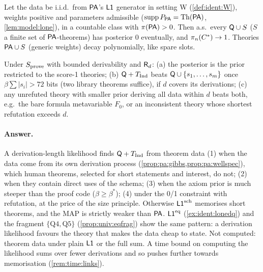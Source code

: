 \begin{proposition}\pabrk{}\label{prop:pa:wellspec}
Let the data be i.i.d.\ from $\mathsf{PA}$'s $\mathord{\mathsf{L1}}$ generator in setting W (\cref{def:ident:W}), weights positive and parameters admissible ($\operatorname{supp}P_{\mathsf{PA}}=\mathrm{Th}(\mathsf{PA})$, \cref{lem:model:lone}), in a countable class with $\pi(\mathsf{PA})>0$. Then a.s.\ every $\mathsf{Q}\cup S$ ($S$ a finite set of $\mathsf{PA}$-theorems) has posterior $0$ eventually, and $\pi_n(C^{*})\to1$. Theories $\mathsf{PA}\cup S$ (generic weights) decay polynomially, like spare slots.
\end{proposition}

\begin{proposition}\pabrk{}\label{prop:pa:must}
Under $S_{\mathrm{prove}}$ with bounded derivability and $\mathsf{R}_{d}$: (a) the posterior is the prior restricted to the score-1 theories; (b) $\mathsf{Q}+T_{\mathrm{Ind}}$ beats $\mathsf{Q}\cup\{s_1,\dots,s_m\}$ once $\beta\sum|s_i|>72$ bits (two library theorems suffice), if $d$ covers its derivations; (c) any unrefuted theory with smaller prior deriving all data within $d$ beats both, e.g.\ the bare formula metavariable $F_0$, or an inconsistent theory whose shortest refutation exceeds $d$.
\end{proposition}

\paragraph{Answer.} A derivation-length likelihood finds $\mathsf{Q}+T_{\mathrm{Ind}}$ from theorem data (1) when the data come from its own derivation process (\cref{prop:pa:gibbs,prop:pa:wellspec}), which human theorems, selected for short statements and interest, do not; (2) when they contain direct uses of the schema; (3) when the axiom prior is much steeper than the proof code ($\beta\ge\beta^*$); (4) under the 0/1 constraint with refutation, at the price of the size principle. Otherwise $\mathord{\mathsf{L1}}^{\mathrm{sch}}$ memorises short theorems, and the MAP is strictly weaker than $\mathsf{PA}$. $\mathord{\mathsf{L1}}^{\mathrm{eq}}$ (\cref{ex:ident:lonedq}) and the fragment $\{\mathrm{Q4},\mathrm{Q5}\}$ (\cref{prop:univ:eqfrag}) show the same pattern: a derivation likelihood favours the theory that makes the data cheap to state. Not computed: theorem data under plain $\mathord{\mathsf{L1}}$ or the full sum. A time bound on computing the likelihood sums over fewer derivations and so pushes further towards memorisation (\cref{rem:time:links}).

